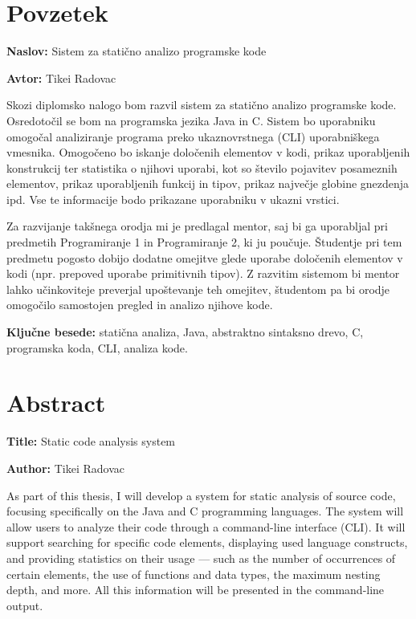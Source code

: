\documentclass[a4paper,12pt,openright]{book}
\newcommand{\ttitle}{Sistem za statično analizo programske kode}
\newcommand{\ttitleEn}{Static code analysis system}
\newcommand{\tauthor}{Tikei Radovac}
\newcommand{\tkeywords}{statična analiza, Java, abstraktno sintaksno drevo, C, programska koda, CLI, analiza kode}
\newcommand{\clearemptydoublepage}{\newpage{\pagestyle{empty}\cleardoublepage}}
\begin{document}
\clearemptydoublepage

{}
\chapter*{Povzetek}

\noindent\textbf{Naslov:} \ttitle
\bigskip

\noindent\textbf{Avtor:} \tauthor
\bigskip

\noindent Skozi diplomsko nalogo bom razvil sistem za statično analizo programske kode. Osredotočil se bom na programska jezika Java in C. Sistem bo uporabniku omogočal analiziranje programa preko ukaznovrstnega (CLI) uporabniškega vmesnika. Omogočeno bo iskanje določenih elementov v kodi, prikaz uporabljenih konstrukcij ter statistika o njihovi uporabi, kot so število pojavitev posameznih elementov, prikaz uporabljenih funkcij in tipov, prikaz največje globine gnezdenja ipd. Vse te informacije bodo prikazane uporabniku v ukazni vrstici.

Za razvijanje takšnega orodja mi je predlagal mentor, saj bi ga uporabljal pri predmetih Programiranje 1 in Programiranje 2, ki ju poučuje. Študentje pri tem predmetu pogosto dobijo dodatne omejitve glede uporabe določenih elementov v kodi (npr. prepoved uporabe primitivnih tipov). Z razvitim sistemom bi mentor lahko učinkoviteje preverjal upoštevanje teh omejitev, študentom pa bi orodje omogočilo samostojen pregled in analizo njihove kode.

\bigskip

\noindent\textbf{Ključne besede:} \tkeywords.
\clearemptydoublepage

{}
\chapter*{Abstract}

\noindent\textbf{Title:} \ttitleEn
\bigskip

\noindent\textbf{Author:} \tauthor
\bigskip

\noindent As part of this thesis, I will develop a system for static analysis of source code, focusing specifically on the Java and C programming languages. The system will allow users to analyze their code through a command-line interface (CLI). It will support searching for specific code elements, displaying used language constructs, and providing statistics on their usage — such as the number of occurrences of certain elements, the use of functions and data types, the maximum nesting depth, and more. All this information will be presented in the command-line output.
\end{document}
